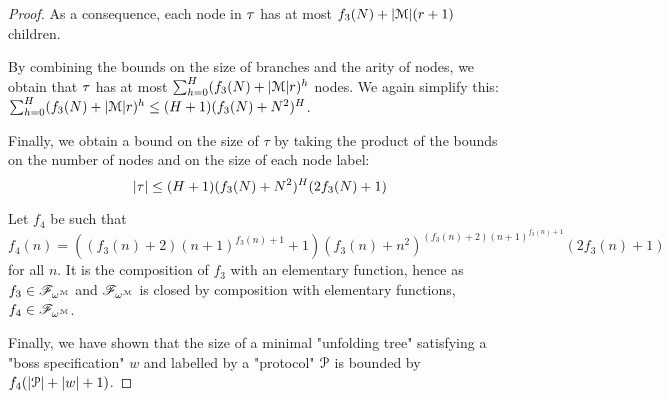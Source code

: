 \begin{proof}
	As a consequence, each node in $\tau$ has at most $f_3(N) + |\mathcal{M}|(r+1)$ children.
	
	By combining the bounds on the size of branches and the arity of nodes, we obtain that $\tau$ has at most $\sum_{h=0}^{H} (f_3(N) + |\mathcal{M}|r)^h$ nodes. We again simplify this: $\sum_{h=0}^{H} (f_3(N) + |\mathcal{M}|r)^h \leq (H+1)(f_3(N) + N^2)^H$.
	
	Finally, we obtain a bound on the size of $\tau$ by taking the product of the bounds on the number of nodes and on the size of each node label: 
	\[ |\tau| \leq  (H+1)(f_3(N) + N^2)^H (2f_3(N) +1)\]
	
	Let $f_4$ be such that $f_4(n) = ((f_3(n)+2)(n+1)^{f_3(n)+1} +1) (f_3(n) + n^2)^{(f_3(n)+2)(n+1)^{f_3(n)+1}}(2f_3(n) +1)$ for all $n$. It is the composition of $f_3$ with an elementary function, hence as $f_3 \in \mathscr{F}_{\omega^{\mathcal{M}}}$ and $\mathscr{F}_{\omega^{\mathcal{M}}}$ is closed by composition with elementary functions, $f_4 \in \mathscr{F}_{\omega^{\mathcal{M}}}$.
	
	Finally, we have shown that the size of a minimal "unfolding tree" satisfying a "boss specification" $w$ and labelled by a "protocol" $\mathcal{P}$ is bounded by $f_4(|\mathcal{P}| + |w| +1)$.
\end{proof}
